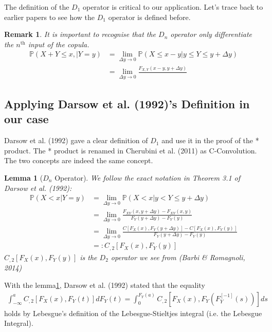 \documentclass[11pt, leqno]{article}
\newtheorem{lemma}{Lemma}[section]
\newtheorem{remark}{Remark}[section]
\numberwithin{equation}{section}
\begin{document}
    The definition of the $D_1$ operator is critical to our application.
Let's trace back to earlier papers to see how the $D_1$ operator is defined before.\newline


    \begin{remark}
        It is important to recognise that the $D_n$ operator only differentiate the $n^\text{th}$ input of the copula.
        \begin{align*}
            \mathbb{P}(X+Y \leq x, | Y=y)
            &= \lim_{\Delta y \rightarrow 0} \mathbb{P}(X \leq x - y| y \leq Y \leq y+\Delta y)\\
            &= \lim_{\Delta y \rightarrow 0}
                \frac{F_{X,Y}(x-y, y+\Delta y)}{}
        \end{align*}
    \end{remark}
\subsection{Applying Darsow et al. (1992)'s Definition in our case}\label{sec:Darsow}

Darsow et al. (1992) gave a clear definition of $D_1$ and use it in the proof of the * product.
The * product is renamed in Cherubini et al. (2011) as C-Convolution.
The two concepts are indeed the same concept.
\begin{lemma}[$D_n$ Operator]\label{lem:Dn} We follow the exact notation in Theorem 3.1 of Darsow et al. (1992):
    \begin{align}
        \mathbb{P}(X<x|Y=y) &= \lim_{\Delta y \rightarrow 0} \mathbb{P}(X<x|y<Y\leq y+ \Delta y)\\
        &= \lim_{\Delta y \rightarrow 0} \frac{F_{XY}(x,y+\Delta y) - F_{XY}(x,y)}{F_Y(y+\Delta y)-F_Y(y)}\\
        &= \lim_{\Delta y \rightarrow 0} \frac{C[F_X(x), F_Y(y+\Delta y)] - C[F_X(x), F_Y(y)]}{F_Y(y+\Delta y)-F_Y(y)}  \label{eq:limD2}\\
        &=: C_{,2}[F_X(x), F_Y(y)]
    \end{align}
$C_{,2}[F_X(x), F_Y(y)]$ is the $D_2$ operator we see from (Barbi \& Romagnoli, 2014)\newline
\end{lemma}

    With the lemma\ref{lem:Dn}, Darsow et al. (1992) stated that the equality
\begin{align} \label{eq:leb}
    \int^a_{-\infty}C_{,2}[F_X(x), F_Y(t)]dF_Y(t) = \int^{F_Y(a)}_0 C_{,2}[F_X(x), F_Y(F_Y^{[-1]}(s))]ds
\end{align}
holds by Lebesgue's definition of the Lebesgue-Stieltjes integral (i.e. the Lebesgue Integral).\newline
\end{document}
